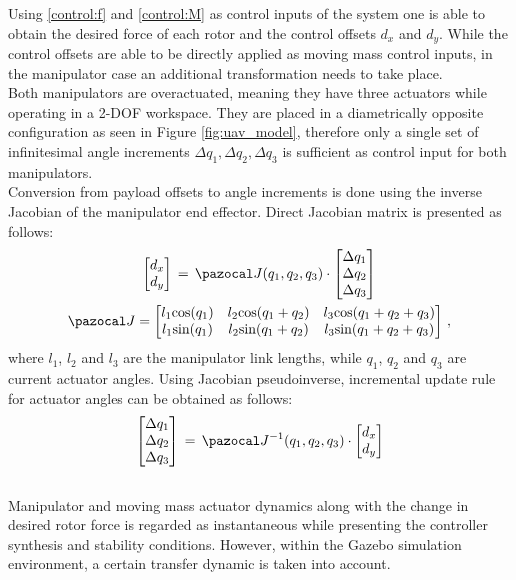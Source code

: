 Using \eqref{control:f} and \eqref{control:M} as control inputs of the system one is able to obtain the desired force of each rotor and the control offsets $d_x$ and $d_y$. While the control offsets are able to be directly applied as moving mass control inputs, in the manipulator case an additional transformation needs to take place. \\
Both manipulators are overactuated, meaning they have three actuators while operating in a 2-DOF workspace. They are placed in a diametrically opposite configuration as seen in Figure \ref{fig:uav_model}, therefore only a single set of infinitesimal angle increments $\Delta q_1, \Delta q_2, \Delta q_3$ is sufficient as control input for both manipulators. \\
Conversion from payload offsets to angle increments is done using the inverse Jacobian of the manipulator end effector. Direct Jacobian matrix is presented as follows:
\begin{gather}
	\begin{bmatrix}
		d_x \\
		d_y
	\end{bmatrix}
	\, = \, 
	\Ja (q_1, q_2, q_3)
	\cdot 
	\begin{bmatrix}
		\Delta q_1 \\
		\Delta q_2 \\
		\Delta q_3
	\end{bmatrix} \\
	\Ja = 
	\begin{bmatrix}
		l_1\text{cos}(q_1) & l_2 \text{cos}(q_1 + q_2) & l_3 \text{cos}(q_1 + q_2 + q_3) \\
		l_1\text{sin}(q_1) & l_2 \text{sin}(q_1 + q_2) & l_3 \text{sin}(q_1 + q_2 + q_3) 
	\end{bmatrix} \, ,
\end{gather}
where $l_1$, $l_2$ and $l_3$ are the manipulator link lengths, while $q_1$, $q_2$ and $q_3$ are current actuator angles. Using Jacobian pseudoinverse, incremental update rule for actuator angles can be obtained as follows:
\begin{equation}
	\begin{bmatrix}
	\Delta q_1 \\
	\Delta q_2 \\
	\Delta q_3
	\end{bmatrix} 
	\, = \, \Ja^{-1} (q_1, q_2, q_3) \cdot
	\begin{bmatrix}
	d_x \\
	d_y
	\end{bmatrix}
\end{equation}
\\
Manipulator and moving mass actuator dynamics along with the change in desired rotor force is regarded as instantaneous while presenting the controller synthesis and stability conditions. However, within the Gazebo simulation environment, a certain transfer dynamic is taken into  account.